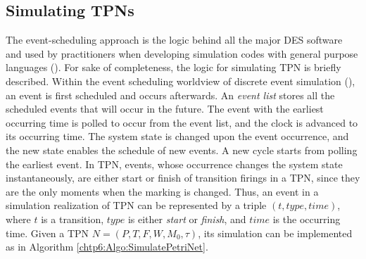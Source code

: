 \documentclass[suppldata]{interact}
\theoremstyle{plain}
\theoremstyle{definition}
\theoremstyle{remark}
\begin{document}
\subsection{Simulating TPNs}\label{sec:ModelSim}
The event-scheduling approach is the logic behind all the major DES software and used by practitioners when developing simulation codes with general purpose languages (\cite{law2014simulation}). For sake of completeness, the logic for simulating TPN is briefly described. Within the event scheduling worldview of discrete event simulation (\cite{zeigler2018theory}), an event is first scheduled and occurs afterwards. 
An \textit{event list} stores all the scheduled events that will occur in the future. The event with the earliest occurring time is polled to occur from the event list, and the clock is advanced to its occurring time. The system state is changed upon the event occurrence, and the new state enables the schedule of new events. A new cycle starts from polling the earliest event. In TPN, events, whose occurrence changes the system state instantaneously, are either start or finish of transition firings in a TPN, since they are the only moments when the marking is changed. Thus, an event in a simulation realization of TPN can be represented by a triple $(t,type,time)$, where $t$ is a transition, $type$ is either \textit{start} or \textit{finish}, and $time$ is the occurring time. Given a TPN $N=(P, T, F,W, M_0, \tau)$, its simulation can be implemented as in Algorithm \ref{chtp6:Algo:SimulatePetriNet}. 
\end{document}
